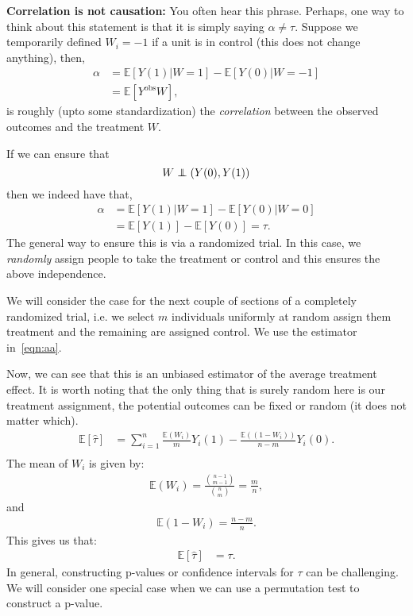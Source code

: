 \documentclass[twoside,12pt]{article}
\begin{document}
{\bf Correlation is not causation: } You often hear this phrase. Perhaps, one way to think about this statement is that it is simply saying $\alpha \neq \tau$. Suppose we temporarily defined $W_i = -1$ if a unit is in control (this does not change anything), then,
\begin{align*}
\alpha &=  \mathbb{E}[Y(1) | W = 1] - \mathbb{E}[Y(0) | W = -1] \\
&= \mathbb{E} [Y^{\text{obs}}W],
\end{align*}
is roughly (upto some standardization) the \emph{correlation} between the observed outcomes and the treatment $W$. 

\newcommand\independent{\protect\mathpalette{\protect\independenT}{\perp}}
\def\independenT#1#2{\mathrel{\rlap{$#1#2$}\mkern2mu{#1#2}}}

If we can ensure that
$$W \independent (Y(0),Y(1))$$
then we indeed have that,
\begin{align*}
\alpha &= \mathbb{E}[Y(1) | W = 1] - \mathbb{E}[Y(0) | W = 0] \\
&= \mathbb{E}[Y(1)] - \mathbb{E}[Y(0)] = \tau.
\end{align*}
The general way to ensure this is via a randomized trial. In this case, we \emph{randomly} assign people to take the treatment or control and this ensures the above independence.

We will consider the case for the next couple of sections of a completely randomized trial, i.e. we select $m$ individuals uniformly at random assign them treatment and the remaining are assigned control. We use the estimator in~\eqref{eqn:aa}.

Now, we can see that this is an unbiased estimator of the average treatment effect.
It is worth noting that the only thing that is surely random here is our treatment assignment, the potential outcomes can be fixed or random (it does not matter which). 
\begin{align*}
\mathbb{E} [\widehat{\tau}] &= \sum_{i=1}^n \frac{ \mathbb{E} \left(W_i\right) }{m} Y_i(1) - 
\frac{\mathbb{E} \left( (1 - W_i) \right)}{n - m} Y_i(0). \\
\end{align*}
The mean of $W_i$ is given by:
\begin{align*}
\mathbb{E}(W_i) = \frac{{n-1 \choose m-1}}{{n \choose m}} = \frac{m}{n},
\end{align*}
and 
\begin{align*}
\mathbb{E}(1 - W_i) = \frac{n - m}{n}.
\end{align*}
This gives us that:
\begin{align*}
\mathbb{E} [\widehat{\tau}] &= \tau.
\end{align*}
In general, constructing p-values or confidence intervals for $\tau$ can be challenging. We will consider one special case when we can use a permutation test to construct a p-value.
\end{document}

